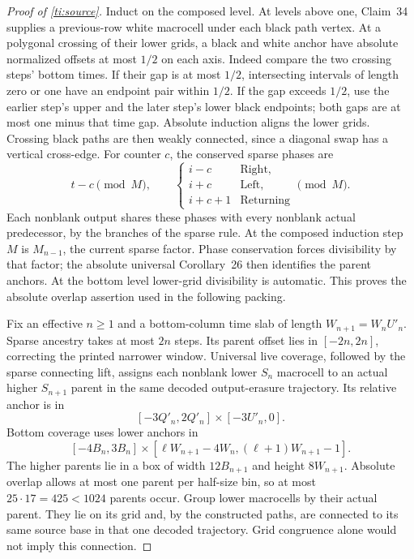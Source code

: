 \begin{proof}[Proof of \cref{ti:source}]
Induct on the composed level. At levels above one, Claim~34 supplies a previous-row white macrocell under each black path vertex. At a polygonal crossing of their lower grids, a black and white anchor have absolute normalized offsets at most $1/2$ on each axis. Indeed compare the two crossing steps' bottom times. If their gap is at most $1/2$, intersecting intervals of length zero or one have an endpoint pair within $1/2$. If the gap exceeds $1/2$, use the earlier step's upper and the later step's lower black endpoints; both gaps are at most one minus that time gap. Absolute induction aligns the lower grids. Crossing black paths are then weakly connected, since a diagonal swap has a vertical cross-edge. For counter $c$, the conserved sparse phases are
\[
 t-c\pmod M,\qquad
 \begin{cases}i-c&\text{Right},\\ i+c&\text{Left},\\ i+c+1&\text{Returning}\end{cases}\pmod M.
\]
Each nonblank output shares these phases with every nonblank actual predecessor, by the branches of the sparse rule. At the composed induction step $M$ is $M_{n-1}$, the current sparse factor. Phase conservation forces divisibility by that factor; the absolute universal Corollary~26 then identifies the parent anchors. At the bottom level lower-grid divisibility is automatic. This proves the absolute overlap assertion used in the following packing.

Fix an effective $n\ge1$ and a bottom-column time slab of length $W_{n+1}=W_nU'_n$. Sparse ancestry takes at most $2n$ steps. Its parent offset lies in $[-2n,2n]$, correcting the printed narrower window. Universal live coverage, followed by the sparse connecting lift, assigns each nonblank lower $S_n$ macrocell to an actual higher $S_{n+1}$ parent in the same decoded output-erasure trajectory. Its relative anchor is in
\[
 [-3Q'_n,2Q'_n]\times[-3U'_n,0].
\]
Bottom coverage uses lower anchors in
\[
 [-4B_n,3B_n]\times[\ell W_{n+1}-4W_n,(\ell+1)W_{n+1}-1].
\]
The higher parents lie in a box of width $12B_{n+1}$ and height $8W_{n+1}$. Absolute overlap allows at most one parent per half-size bin, so at most $25\cdot17=425<1024$ parents occur. Group lower macrocells by their actual parent. They lie on its grid and, by the constructed paths, are connected to its same source base in that one decoded trajectory. Grid congruence alone would not imply this connection.


\end{proof}
